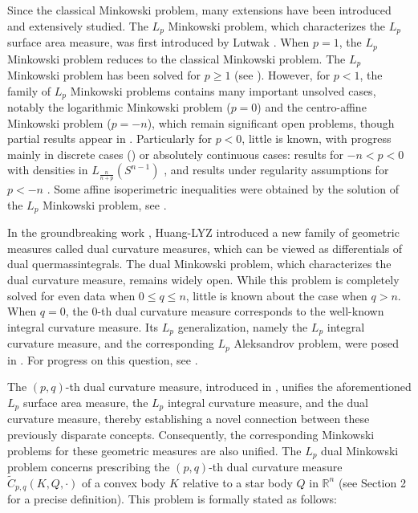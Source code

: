 \documentclass[12pt, reqno]{amsart}
\theoremstyle{definition}
\theoremstyle{remark}
\numberwithin{equation}{section}
\newcommand{\Rn}{\mathbb{R}^{n}}
\newcommand{\Lp}{L_{p}}
\begin{document}
	  
	  
	  Since the classical Minkowski problem, many extensions have been introduced and extensively studied. The $L_p$ Minkowski problem, which characterizes the $L_p$ surface area measure, was first introduced by Lutwak \cite{Lutwak1993,Lutwak1996}. When $p = 1$, the $L_p$ Minkowski problem reduces to the classical Minkowski problem.  The $L_p$ Minkowski problem has been solved for $p\ge1$ (see  \cite{lyz2004,Lutwak1993,L-O 1995}). However, for $p<1$, the family of $L_p$ Minkowski problems contains many important unsolved cases, notably the logarithmic Minkowski problem ($p=0$) and the centro-affine Minkowski problem ($p=-n$), which remain significant open problems, though partial results appear in \cite{BHZ2016,CLZ2019,JJZ2016,LW2013,zhu2014,zhu2015}.  Particularly for $p<0$, little is known, with progress mainly in discrete cases (\cite{zhu2015,zhu2017}) or absolutely continuous cases: results for $-n<p<0$ with densities in $L_{\frac{n}{n+p}}(S^{n-1})$ \cite{B-B-A-Y 2019,chou-wang}, and results under regularity assumptions for $p<-n$ \cite{GLW}. Some affine isoperimetric inequalities were obtained by the solution of the $\Lp$ Minkowski problem, see \cite{CGlpine,HFGlpine,LYZ2000lp,lyz2002}.
	  
	  In the groundbreaking work \cite{HLYZdual}, Huang-LYZ introduced a new family of geometric measures called dual curvature measures, which can be viewed as differentials of dual quermassintegrals. The dual Minkowski problem, which characterizes the dual curvature measure, remains widely open. While this problem is completely solved for even data when $0 \leq q \leq n$,  little is known about the case when $q > n$.  When 
	  $q=0$, the $0$-th dual curvature measure corresponds to the well-known integral curvature measure. Its $L_p$ generalization, namely the $L_p$ integral curvature measure, and the corresponding $L_p$ Aleksandrov problem, were posed in \cite{HLYZ2018}.
	   For progress  on this question, see \cite{BHP2018,BLYZZ2019,chenli 2018,EH2023,HLXZ,lsw,Lyzdualcone,zhao2017,zhao2018}.
	  
	  
	  The $(p, q)$-th dual curvature measure, introduced in \cite{lyz2018}, unifies the aforementioned $L_p$ surface area measure, the $L_p$ integral curvature measure, and the dual curvature measure, thereby establishing a novel connection between these previously disparate concepts. Consequently, the corresponding Minkowski problems for these geometric measures are also unified. The $\Lp$ dual Minkowski problem concerns prescribing the
	    $(p, q)$-th dual curvature measure $\widetilde{C}_{p,q} (K, Q, \cdot) $ of a convex body $K$ relative to a star body $Q$ in $\Rn$ (see Section 2 for a precise definition). This problem is formally stated as follows:
	    
\end{document}
